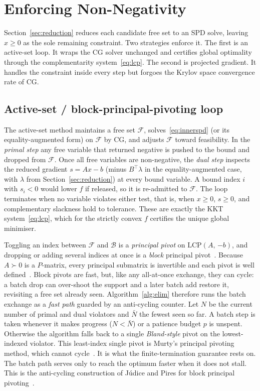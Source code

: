 \section{Enforcing Non-Negativity}\label{sec:nonneg}

Section~\ref{sec:reduction} reduces each candidate free set to an SPD solve, leaving
$x \geq 0$ as the sole remaining constraint. Two strategies enforce it. The first is an
active-set loop. It wraps the CG solver unchanged and certifies global optimality through the
complementarity system~\eqref{eq:lcp}. The second is projected gradient. It handles the
constraint inside every step but forgoes the Krylov space convergence rate of CG.

\subsection{Active-set / block-principal-pivoting loop}\label{ssec:activeset}

The active-set method maintains a free set $\mathcal{F}$, solves~\eqref{eq:innerspd} (or its
equality-augmented form) on $\mathcal{F}$ by CG, and adjusts $\mathcal{F}$ toward
feasibility. In the \emph{primal step} any free variable that returned negative is pushed to
the bound and dropped from $\mathcal{F}$. Once all free variables are non-negative, the
\emph{dual step} inspects the reduced gradient $s = Ax - b$ (minus $B^\top\lambda$ in the
equality-augmented case, with $\lambda$ from Section~\ref{sec:reduction}) at every bound
variable. A bound index $i$ with $s_i < 0$ would lower $f$ if released, so it is re-admitted
to $\mathcal{F}$. The loop terminates when no variable violates either test, that is, when
$x \geq 0$, $s \geq 0$, and complementary slackness hold to tolerance. These are exactly the
KKT system~\eqref{eq:lcp}, which for the strictly convex $f$ certifies the unique global
minimiser.

Toggling an index between $\mathcal{F}$ and $\mathcal{B}$ is a \emph{principal pivot} on
$\mathrm{LCP}(A,\,{-b})$, and dropping or adding several indices at once is a \emph{block}
principal pivot~\cite{judice1994,kim2011}. Because $A \succ 0$ is a $P$-matrix, every
principal submatrix is invertible and each pivot is well defined~\cite{murty1988}. Block
pivots are fast, but, like any all-at-once exchange, they can cycle: a batch drop can
over-shoot the support and a later batch add restore it, revisiting a free set already seen.
Algorithm~\ref{alg:elim} therefore runs the batch exchange as a \emph{fast path} guarded by an
anti-cycling counter. Let $N$ be the current number of primal and dual violators and $\bar N$
the fewest seen so far. A batch step is taken whenever it makes progress ($N < \bar N$) or a
patience budget $p$ is unspent. Otherwise the algorithm falls back to a single
\emph{Bland-style} pivot on the lowest-indexed violator. This least-index single pivot is
Murty's principal pivoting method, which cannot cycle~\cite{murty1988}. It is what the
finite-termination guarantee rests on. The batch path serves only to reach the optimum faster
when it does not stall. This is the anti-cycling construction of J\'udice and Pires for block
principal pivoting~\cite{judice1994}.

